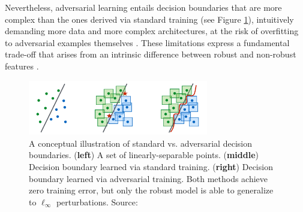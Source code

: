 Nevertheless, adversarial learning entails decision boundaries 
that are more complex than the ones derived via standard training
(see Figure \ref{fig:adversarial_complexity}), 
intuitively demanding more data and more complex 
architectures, at the risk of
overfitting to adversarial examples themselves
\cite{schmidtAdversariallyRobustGeneralization2018}. 
These limitations express a fundamental trade-off 
that arises from an intrinsic 
difference between robust and non-robust features
\cite{tsiprasRobustnessMayBe2019, zhangTheoreticallyPrincipledTradeoff2019}. \\

\begin{figure}[h]
    \centering
    \includegraphics[width=0.7\textwidth]{img/introduction/adversarial_complexity.png}
    \caption{
    A conceptual illustration of standard vs. adversarial 
    decision boundaries. (\textbf{left}) A set of linearly-separable points. 
    (\textbf{middle}) Decision boundary learned via standard training.
    (\textbf{right}) Decision boundary learned via adversarial training.
    Both methods achieve zero training error, but only the robust model
    is able to generalize to $\ell_\infty$ perturbations.
    Source: \cite{madryDeepLearningModels2019}
    }
    \label{fig:adversarial_complexity}
\end{figure}



